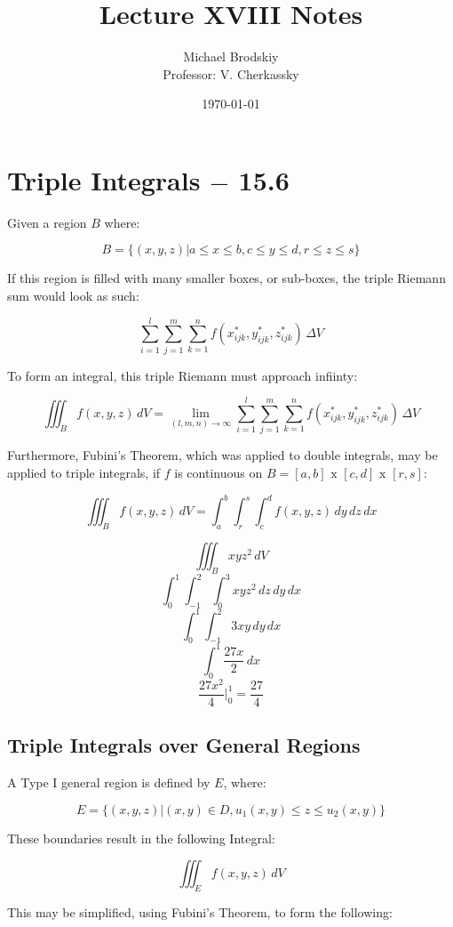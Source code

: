 \documentclass[12pt]{article}
\title{Lecture XVIII Notes}
\date{\today}
\author{Michael Brodskiy\\ \small Professor: V. Cherkassky}
\begin{document}
\maketitle

\section{Triple Integrals $-$ 15.6}

Given a region $B$ where:

$$B=\{(x,y,z)|a\leq x\leq b, c\leq y\leq d, r\leq z\leq s\}$$

If this region is filled with many smaller boxes, or sub-boxes, the triple Riemann sum would look as such:

$$\sum_{i=1}^l\sum_{j=1}^m\sum_{k=1}^n f(x_{ijk}^*,y_{ijk}^*,z_{ijk}^*)\,\Delta V$$

To form an integral, this triple Riemann must approach infiinty:

$$\iiint_B f(x,y,z)\,dV=\lim_{(l,m,n)\to\infty}\sum_{i=1}^l\sum_{j=1}^m\sum_{k=1}^n f(x_{ijk}^*,y_{ijk}^*,z_{ijk}^*)\,\Delta V$$

Furthermore, Fubini's Theorem, which was applied to double integrals, may be applied to triple integrals, if $f$ is continuous on $B=[a,b]\text{ x }[c,d]\text{ x }[r,s]$:

$$\iiint_B f(x,y,z)\,dV=\int_a^b\int_r^s\int_c^df(x,y,z)\,dy\,dz\,dx$$

$$\iiint_B xyz^2\,dV$$
$$\int_0^1\int_{-1}^2\int_0^3 xyz^2\,dz\,dy\,dx$$
$$\int_0^1\int_{-1}^2 3xy\,dy\,dx$$
$$\int_0^1\frac{27x}{2}\,dx$$
$$\frac{27x^2}{4}\Big|_0^1=\frac{27}{4}$$

\subsection{Triple Integrals over General Regions}

A Type I general region is defined by $E$, where:

$$E=\{(x,y,z)|(x,y)\in D, u_1(x,y)\leq z\leq u_2(x,y)\}$$

These boundaries result in the following Integral:

$$\iiint_E f(x,y,z)\,dV$$

This may be simplified, using Fubini's Theorem, to form the following:
\end{document}
